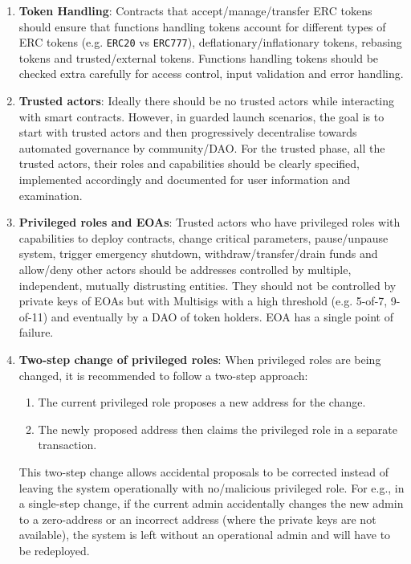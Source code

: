 \begin{enumerate}
\item\textbf{Token Handling}: Contracts that accept/manage/transfer ERC tokens should ensure that functions handling tokens account for different types of ERC tokens (e.g. \verb|ERC20| vs \verb|ERC777|), deflationary/inflationary tokens, rebasing tokens and trusted/external tokens. Functions handling tokens should be checked extra carefully for access control, input validation and error handling.

\item\textbf{Trusted actors}: Ideally there should be no trusted actors while interacting with smart contracts. However, in guarded launch scenarios, the goal is to start with trusted actors and then progressively decentralise towards automated governance by community/DAO. For the trusted phase, all the trusted actors, their roles and capabilities should be clearly specified, implemented accordingly and documented for user information and examination.

\item\textbf{Privileged roles and EOAs}: Trusted actors who have privileged roles with capabilities to deploy contracts, change critical parameters, pause/unpause system, trigger emergency shutdown, withdraw/transfer/drain funds and allow/deny other actors should be addresses controlled by multiple, independent, mutually distrusting entities. They should not be controlled by private keys of EOAs but with Multisigs with a high threshold (e.g. 5-of-7, 9-of-11) and eventually by a DAO of token holders. EOA has a single point of failure.

\item\textbf{Two-step change of privileged roles}: When privileged roles are being changed, it is recommended to follow a two-step approach:
    \begin{enumerate}
    \item The current privileged role proposes a new address for the change.
    \item The newly proposed address then claims the privileged role in a separate transaction.
    \end{enumerate}
This two-step change allows accidental proposals to be corrected instead of leaving the system operationally with no/malicious privileged role. For e.g., in a single-step change, if the current admin accidentally changes the new admin to a zero-address or an incorrect address (where the private keys are not available), the system is left without an operational admin and will have to be redeployed.


\end{enumerate}
